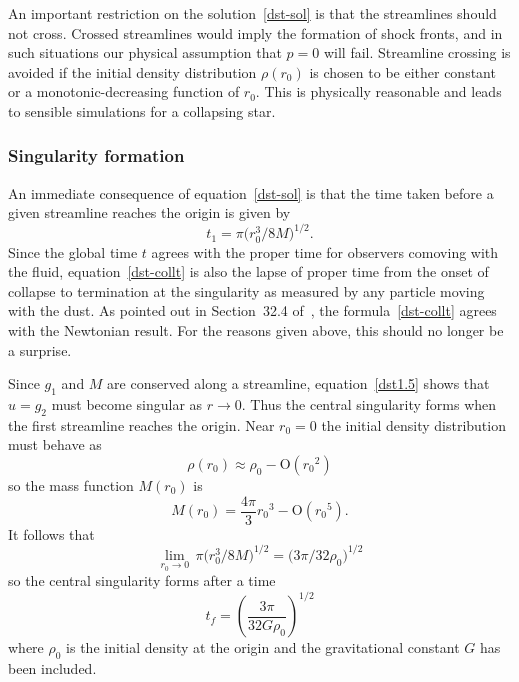 \documentclass[a4paper]{article}
\numberwithin{equation}{section}
\begin{document}
An important restriction on the solution~\eqref{dst-sol} is that the
streamlines should not cross.  Crossed streamlines would imply the
formation of shock fronts, and in such situations our physical
assumption that $p=0$ will fail.  Streamline crossing is avoided if
the initial density distribution $\rho(r_0)$ is chosen to be either
constant or a monotonic-decreasing function of $r_0$.  This is
physically reasonable and leads to sensible simulations for a
collapsing star.


\subsubsection*{Singularity formation}

An immediate consequence of equation~\eqref{dst-sol} is that the time
taken before a given streamline reaches the origin is given by
%
\begin{equation}
t_1 = \pi  \bigl(r_0^3/8M \bigr)^{1/2}.
\label{dst-collt}
\end{equation}
%
Since the global time $t$ agrees with the proper time for observers
comoving with the fluid, equation~\eqref{dst-collt} is also the lapse of
proper time from the onset of collapse to termination at the
singularity as measured by any particle moving with the dust.  As
pointed out in Section~32.4 of~\cite{mis-grav}, the
formula~\eqref{dst-collt} agrees with the Newtonian result.  For the
reasons given above, this should no longer be a surprise.


Since $g_1$ and $M$ are conserved along a streamline,
equation~\eqref{dst1.5} shows that $u=g_2$ must become singular as
$r\rightarrow 0$.  Thus the central singularity forms when the first
streamline reaches the origin.  Near $r_0=0$ the initial density
distribution must behave as
%
\begin{equation}
\rho(r_0) \approx \rho_0 -\mbox{O}({r_0}^2)
\end{equation}
%
so the mass function $M(r_0)$ is
%
\begin{equation}
M(r_0) = \frac{4\pi}{3} {r_0}^3 - \mbox{O}({r_0}^5).
\end{equation}
%
It follows that 
%
\begin{equation}
\lim_{r_0\rightarrow 0} \, \pi  \bigl(r_0^3/8M \bigr)^{1/2} = \bigl( 3
\pi / 32\rho_0 \bigr)^{1/2} 
\end{equation}
%
so the central singularity forms after a time 
%
\begin{equation}
t_f = \left( \frac{3\pi}{32G\rho_0} \right)^{1/2} 
\label{cos-singform}
\end{equation}
%
where $\rho_0$ is the initial density at the origin and the
gravitational constant $G$ has been included. 
\end{document}
